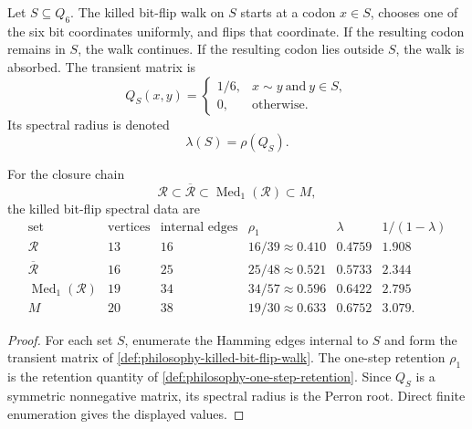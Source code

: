 \begin{definition}
\label{def:philosophy-killed-bit-flip-walk}
Let $S\subseteq Q_{6}$. The killed bit-flip walk on $S$ starts at a
codon $x\in S$, chooses one of the six bit coordinates uniformly, and
flips that coordinate. If the resulting codon remains in $S$, the walk
continues. If the resulting codon lies outside $S$, the walk is absorbed.
The transient matrix is
$$
  Q_S(x,y)
  =
  \begin{cases}
    1/6, & x\sim y\ \text{and}\ y\in S,\\
    0, & \text{otherwise}.
  \end{cases}
$$
Its spectral radius is denoted
$$
  \lambda(S)=\rho(Q_S).
$$
\end{definition}

\begin{theorem}
\label{thm:philosophy-spectral-stabilization-closure-chain}
For the closure chain
$$
  \mathcal{R}
  \subset
  \overline{\mathcal{R}}
  \subset
  \operatorname{Med}_{1}(\mathcal{R})
  \subset
  M,
$$
the killed bit-flip spectral data are
$$
\begin{array}{c|r|r|r|r|r}
  \text{set} & \text{vertices} & \text{internal edges}
  & \rho_1 & \lambda & 1/(1-\lambda)\\
  \hline
  \mathcal{R} & 13 & 16 & 16/39\approx 0.410
    & 0.4759 & 1.908\\
  \overline{\mathcal{R}} & 16 & 25 & 25/48\approx 0.521
    & 0.5733 & 2.344\\
  \operatorname{Med}_{1}(\mathcal{R}) & 19 & 34 & 34/57\approx 0.596
    & 0.6422 & 2.795\\
  M & 20 & 38 & 19/30\approx 0.633
    & 0.6752 & 3.079.
\end{array}
$$
\end{theorem}
\begin{proof}
For each set $S$, enumerate the Hamming edges internal to $S$ and form
the transient matrix of \autoref{def:philosophy-killed-bit-flip-walk}.
The one-step retention $\rho_1$ is the retention quantity of
\autoref{def:philosophy-one-step-retention}. Since $Q_S$ is a symmetric
nonnegative matrix, its spectral radius is the Perron root. Direct finite
enumeration gives the displayed values.
\end{proof}

